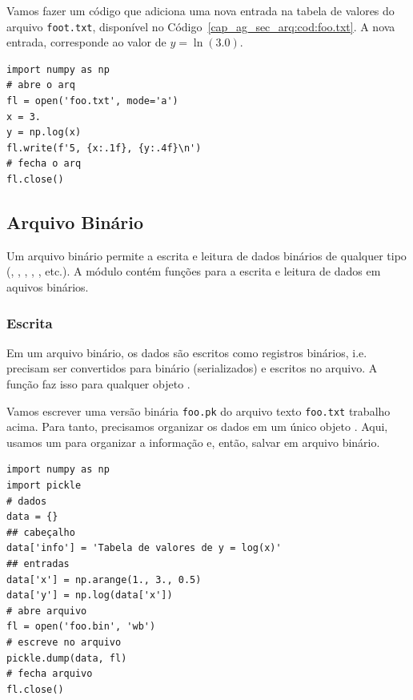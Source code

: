 \begin{ex}
  Vamos fazer um código que adiciona uma nova entrada na tabela de valores do arquivo \texttt{foot.txt}, disponível no Código~\ref{cap_ag_sec_arq:cod:foo.txt}. A nova entrada, corresponde ao valor de $y = \ln(3.0)$.

\begin{lstlisting}
import numpy as np
# abre o arq
fl = open('foo.txt', mode='a')
x = 3.
y = np.log(x)
fl.write(f'5, {x:.1f}, {y:.4f}\n')
# fecha o arq
fl.close()
\end{lstlisting}

\end{ex}

\subsection{Arquivo Binário}\label{cap_ag_sec_arq:ssec:arqbin}

Um arquivo binário permite a escrita e leitura de dados binários de qualquer tipo ({\PYTHONint}, {\PYTHONfloat}, {\PYTHONstr}, {\PYTHONtuple}, {\PYTHONlist}, etc.). A módulo {\PYTHONpickle} contém funções para a escrita e leitura de dados em aquivos binários.

\subsubsection{Escrita}

Em um arquivo binário, os dados são escritos como registros binários, i.e. precisam ser convertidos para binário (serializados) e escritos no arquivo. A função {\PYTHONpickleDOTdump} faz isso para qualquer objeto {\python}.

\begin{ex}
  Vamos escrever uma versão binária \lstinline+foo.pk+ do arquivo texto \texttt{foo.txt} trabalho acima. Para tanto, precisamos organizar os dados em um único objeto {\python}. Aqui, usamos um {\PYTHONdict} para organizar a informação e, então, salvar em arquivo binário.

\begin{lstlisting}[caption=foo.bin, label=cap_ag_sec_arq:cod:foo.bin]
import numpy as np
import pickle
# dados
data = {}
## cabeçalho
data['info'] = 'Tabela de valores de y = log(x)'
## entradas
data['x'] = np.arange(1., 3., 0.5)
data['y'] = np.log(data['x'])
# abre arquivo
fl = open('foo.bin', 'wb')
# escreve no arquivo
pickle.dump(data, fl)
# fecha arquivo
fl.close()
\end{lstlisting}

\end{ex}


